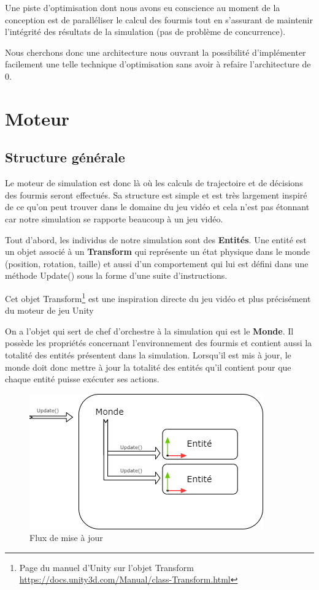 \documentclass{EPUProjetDi}
\begin{document}
Une piste d'optimisation dont nous avons eu conscience au moment de la conception est de paralléliser le calcul des fourmis tout en s'assurant de maintenir
l'intégrité des résultats de la simulation (pas de problème de concurrence).

Nous cherchons donc une architecture nous ouvrant la possibilité d'implémenter facilement une telle technique d'optimisation sans avoir à
refaire l'architecture de 0. 

\pagebreak

\section{Moteur}

\subsection{Structure générale}

Le moteur de simulation est donc là où les calculs de trajectoire et de décisions des fourmis seront effectués.
Sa structure est simple et est très largement inspiré de ce qu'on peut trouver dans le domaine du jeu vidéo et 
cela n'est pas étonnant car notre simulation se rapporte beaucoup à un jeu vidéo.

Tout d'abord, les individus de notre simulation sont des \textbf{Entités}. Une entité est un objet associé à un
\textbf{Transform} qui représente un état physique dans le monde (position, rotation, taille) et aussi d'un comportement
qui lui est défini dans une méthode Update() sous la forme d'une suite d'instructions.

Cet objet Transform\footnote{Page du manuel d'Unity sur l'objet Transform \url{https://docs.unity3d.com/Manual/class-Transform.html}} 
est une inspiration directe du jeu vidéo et plus précisément du moteur de jeu Unity

On a l'objet qui sert de chef d'orchestre à la simulation qui est le \textbf{Monde}. Il possède les propriétés concernant 
l'environnement des fourmis et contient aussi la totalité des entités présentent dans la simulation.
Lorsqu'il est mis à jour, le monde doit donc mettre à jour la totalité des entités qu'il contient pour que chaque entité 
puisse exécuter ses actions.

\begin{figure}[h]
    \centering
    \includegraphics[scale=0.8]{moteur_structuregenerale.png}
    \caption{Flux de mise à jour}
    \label{fig:flow_update}
\end{figure}
\end{document}
